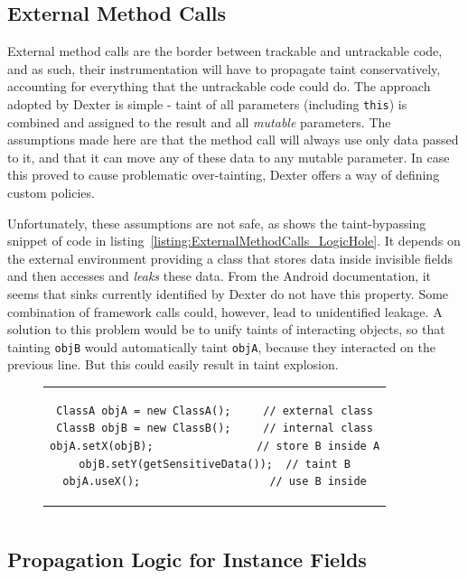 \documentclass[12pt,twoside,notitlepage]{report}
\begin{document}
\subsection{External Method Calls}

External method calls are the border between trackable and untrackable code, and as such, their instrumentation will have to propagate taint conservatively, accounting for everything that the untrackable code could do. The approach adopted by Dexter is simple - taint of all parameters (including \verb$this$) is combined and assigned to the result and all \emph{mutable} parameters. The assumptions made here are that the method call will always use only data passed to it, and that it can move any of these data to any mutable parameter. In case this proved to cause problematic over-tainting, Dexter offers a way of defining custom policies.

Unfortunately, these assumptions are not safe, as shows the taint-bypassing snippet of code in listing~\ref{listing:ExternalMethodCalls_LogicHole}. It depends on the external environment providing a class that stores data inside invisible fields and then accesses and \emph{leaks} these data. From the Android documentation, it seems that sinks currently identified by Dexter do not have this property. Some combination of framework calls could, however, lead to unidentified leakage. A solution to this problem would be to unify taints of interacting objects, so that tainting \verb$objB$ would automatically taint \verb$objA$, because they interacted on the previous line. But this could easily result in taint explosion.

\begin{figure}[h]
	\centering
	\begin{tabular}{c}
	\begin{lstlisting}
ClassA objA = new ClassA();     // external class
ClassB objB = new ClassB();     // internal class
objA.setX(objB);                // store B inside A
objB.setY(getSensitiveData());  // taint B
objA.useX();                    // use B inside
	\end{lstlisting}
	\end{tabular}
	\begin{lstlisting}[caption={Example of a propagation logic hole},
	                   label={listing:ExternalMethodCalls_LogicHole}]
	\end{lstlisting}
\end{figure}

\subsection{Propagation Logic for Instance Fields}
\end{document}
